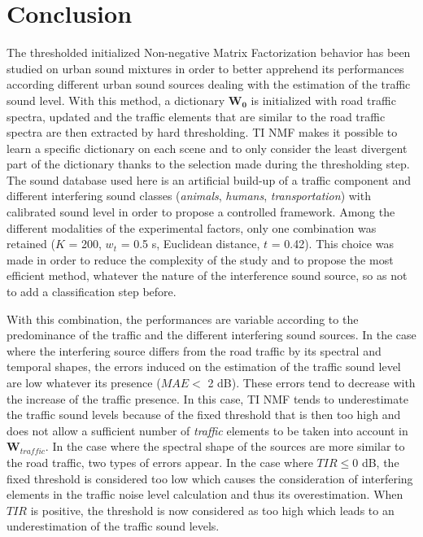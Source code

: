 \documentclass[12pt,english,twoside]{article}
\begin{document}
\section{Conclusion}

The thresholded initialized Non-negative Matrix Factorization behavior has been studied on urban sound mixtures in order to better apprehend its performances according different urban sound sources dealing with the estimation of the traffic sound level.
With this method, a dictionary $\mathbf{W_0}$ is initialized
with road traffic spectra, updated and the traffic
elements that are similar to the road traffic spectra are then extracted by hard thresholding. 
TI NMF makes it possible to learn a specific dictionary on each scene and to only consider the least divergent part of the dictionary thanks to the selection made during the thresholding step.
The sound database used here is an artificial build-up of a traffic component and different interfering sound classes (\textit{animals}, \textit{humans}, \textit{transportation}) with calibrated sound level in order to propose a controlled framework.
Among the different modalities of the experimental factors, only one combination was retained ($K$ = 200, $w_t$ = 0.5 s, Euclidean distance, $t$ = 0.42). This choice was made in order to reduce the complexity of the study and to propose the most efficient method, whatever the nature of the interference sound source, so as not to add a classification step before.

With this combination, the performances are variable according to the predominance of the traffic and the different interfering sound sources. In the case where the interfering source differs from the road traffic by its spectral and temporal shapes, the errors induced on the estimation of the traffic sound level are low whatever its presence ($MAE <$ 2 dB). These errors tend to decrease with the increase of the traffic presence. In this case, TI NMF tends to underestimate the traffic sound levels because of the fixed threshold that is then too high and does not allow a sufficient number of \textit{traffic} elements to be taken into account in $\mathbf{W}_{traffic}$.
In the case where the spectral shape of the sources are more similar to the road traffic, two types of errors appear. In the case where $TIR \leq 0$ dB, the fixed threshold is considered too low which causes the consideration of interfering elements in the  traffic noise level calculation and thus its overestimation. When $TIR$ is positive, the threshold is now considered as too high which leads to an underestimation of the traffic sound levels.
\end{document}
